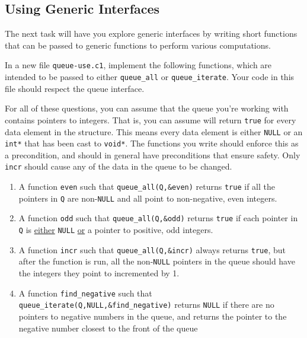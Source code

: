\documentclass[12pt]{exam}
\begin{document}
\subsection{Using Generic Interfaces}

The next task will have you explore generic interfaces by writing short
functions that can be passed to generic functions to perform various
computations.

\newpage
\begin{task}[6]
  In a new file \lstinline'queue-use.c1', implement the following
  functions, which are intended to be passed to either
  \lstinline'queue_all' or \lstinline'queue_iterate'. Your code in
  this file should respect the queue interface.

  For all of these questions, you can assume that the queue you're
  working with contains pointers to integers. That is, you can assume
   will return \lstinline'true' for every data
  element in the structure. This means every data element is either
  \lstinline'NULL' or an \lstinline'int*' that has been cast to
  \lstinline'void*'. The functions you write should enforce this as a
  precondition, and should in general have preconditions that ensure
  safety. Only \lstinline'incr' should cause any of the data in the
  queue to be changed.
  \begin{enumerate}
  \item%
    A function \lstinline'even' such that
    \lstinline'queue_all(Q,&even)' returns \lstinline'true' if all the
    pointers in \lstinline'Q' are non-\lstinline'NULL' and all point
    to non-negative, even integers.
  \item%
    A function \lstinline'odd' such that \lstinline'queue_all(Q,&odd)'
    returns \lstinline'true' if each pointer in \lstinline'Q' is
    \underline{either} \lstinline'NULL' \underline{or} a pointer to
    positive, odd integers.
  \item%
    A function \lstinline'incr' such that
    \lstinline'queue_all(Q,&incr)' always returns \lstinline'true',
    but after the function is run, all the non-\lstinline'NULL'
    pointers in the queue should have the integers they point to
    incremented by 1.
\item A function \lstinline'find_negative' such that
  \lstinline'queue_iterate(Q,NULL,&find_negative)' returns \lstinline'NULL' if
  there are no pointers to negative numbers in the queue, and returns
  the pointer to the negative number closest to the front of the queue

\end{enumerate}
\end{task}
\end{document}
